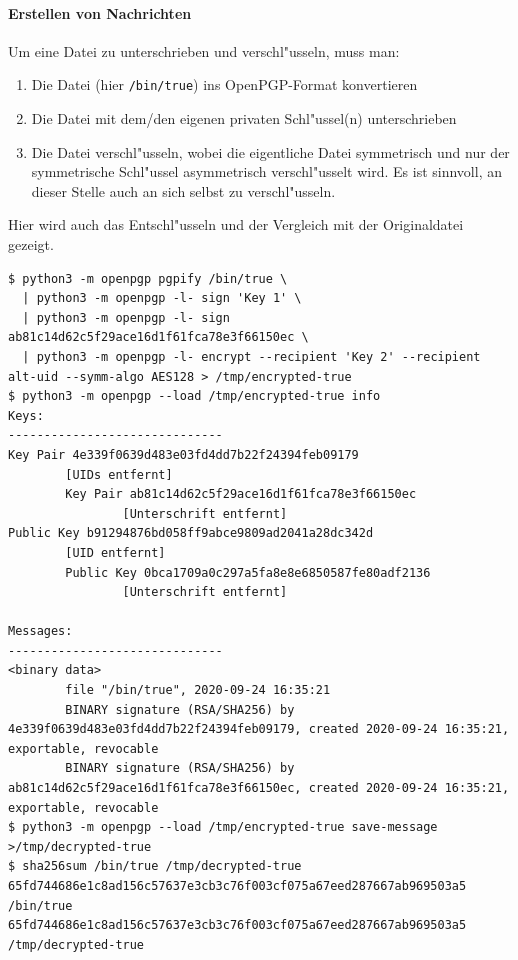 \documentclass[12pt]{article}
\begin{document}
\paragraph{Erstellen von Nachrichten}
Um eine Datei zu unterschrieben und verschl"usseln, muss man:
\begin{enumerate}
    \item Die Datei (hier \texttt{/bin/true}) ins OpenPGP-Format konvertieren
    \item Die Datei mit dem/den eigenen privaten Schl"ussel(n) unterschrieben
    \item Die Datei verschl"usseln, wobei die eigentliche Datei symmetrisch
        und nur der symmetrische Schl"ussel asymmetrisch verschl"usselt wird.
        Es ist sinnvoll, an dieser Stelle auch an sich selbst zu verschl"usseln.
\end{enumerate}
Hier wird auch das Entschl"usseln und der Vergleich mit der Originaldatei gezeigt.
\begin{lstlisting}
$ python3 -m openpgp pgpify /bin/true \
  | python3 -m openpgp -l- sign 'Key 1' \
  | python3 -m openpgp -l- sign ab81c14d62c5f29ace16d1f61fca78e3f66150ec \
  | python3 -m openpgp -l- encrypt --recipient 'Key 2' --recipient alt-uid --symm-algo AES128 > /tmp/encrypted-true
$ python3 -m openpgp --load /tmp/encrypted-true info
Keys:
------------------------------
Key Pair 4e339f0639d483e03fd4dd7b22f24394feb09179
        [UIDs entfernt]
        Key Pair ab81c14d62c5f29ace16d1f61fca78e3f66150ec
                [Unterschrift entfernt]
Public Key b91294876bd058ff9abce9809ad2041a28dc342d
        [UID entfernt]
        Public Key 0bca1709a0c297a5fa8e8e6850587fe80adf2136
                [Unterschrift entfernt]

Messages:
------------------------------
<binary data>
        file "/bin/true", 2020-09-24 16:35:21
        BINARY signature (RSA/SHA256) by 4e339f0639d483e03fd4dd7b22f24394feb09179, created 2020-09-24 16:35:21, exportable, revocable
        BINARY signature (RSA/SHA256) by ab81c14d62c5f29ace16d1f61fca78e3f66150ec, created 2020-09-24 16:35:21, exportable, revocable
$ python3 -m openpgp --load /tmp/encrypted-true save-message >/tmp/decrypted-true
$ sha256sum /bin/true /tmp/decrypted-true
65fd744686e1c8ad156c57637e3cb3c76f003cf075a67eed287667ab969503a5  /bin/true
65fd744686e1c8ad156c57637e3cb3c76f003cf075a67eed287667ab969503a5  /tmp/decrypted-true
\end{lstlisting}
\end{document}
